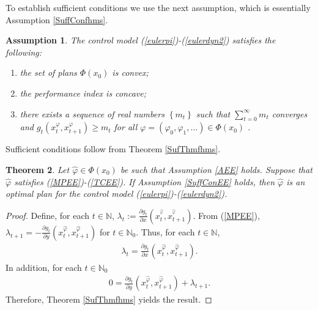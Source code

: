 \documentclass[3p]{elsarticle}
\newcommand{\nat}{\mathbb N_0}
\newcommand{\natu}{\mathbb N}
\newtheorem{thm}{Theorem}
\newtheorem{assu}[thm]{Assumption}
\begin{document}
	To establish sufficient conditions we use the next assumption, which is essentially Assumption \ref{SuffConfhms}.
	
	\begin{assu}
		The control model (\ref{eulerpi})-(\ref{eulerdyn2}) satisfies the following:
		\begin{enumerate}\label{SuffConEE}
			\item[(a)]  the set of plans $\varPhi(x_0)$ is convex;	\item[(b)] the performance index is concave;
			\item[(c)]	there exists a sequence of real  numbers $\left\lbrace m_t\right\rbrace $ such that $\sum_{t=0}^\infty m_t$ converges and 
			$
			g_t(x_t^\varphi,x_{t+1}^\varphi)\ge m_t
			$ 
			for all  $\varphi=(\varphi_0,\varphi_1,\dots)\in\varPhi(x_0)$ .
		\end{enumerate}
	\end{assu}
	
	
	
	
	
	Sufficient conditions follow from Theorem \ref{SufThmfhms}.
	
	\begin{thm}\label{SufThmfhEE}
		Let $\hat{\varphi}\in\varPhi(x_0)$ be such that Assumption \ref{AEE} holds. Suppose that $\hat\varphi$ satisfies (\ref{MPEE})-(\ref{TCEE}). If Assumption \ref{SuffConEE} holds, then $\hat\varphi$ is an optimal plan for the control model (\ref{eulerpi})-(\ref{eulerdyn2}).
	\end{thm}
	\begin{proof}
		Define, for each $t\in\natu$,  $\displaystyle\lambda_t:=\frac{\partial g_t}{\partial x}(x_t^{\hat{^\varphi}},x_{t+1}^{\hat{^\varphi}})$. From (\ref{MPEE}), $\displaystyle\lambda_{t+1} =-\frac{\partial g_t}{\partial y}(x_t^{\hat\varphi},x_{t+1}^{\hat\varphi})$ for $t\in\nat$. Thus,
		for each $t\in\natu$,
		\begin{align*}
		\lambda_{t}=\frac{\partial g_t}{\partial x}(x_t^{\hat\varphi},x_{t+1}^{\hat\varphi}).
		\end{align*}
		In addition, for each $t\in\nat$
		\begin{align*}
		0=\frac{\partial g_t}{\partial y}(x_t^{\hat\varphi},x_{t+1}^{\hat\varphi})+\lambda_{t+1}.
		\end{align*}
		Therefore, Theorem \ref{SufThmfhms} yields the result.
	\end{proof}
	
	
	
\end{document}
